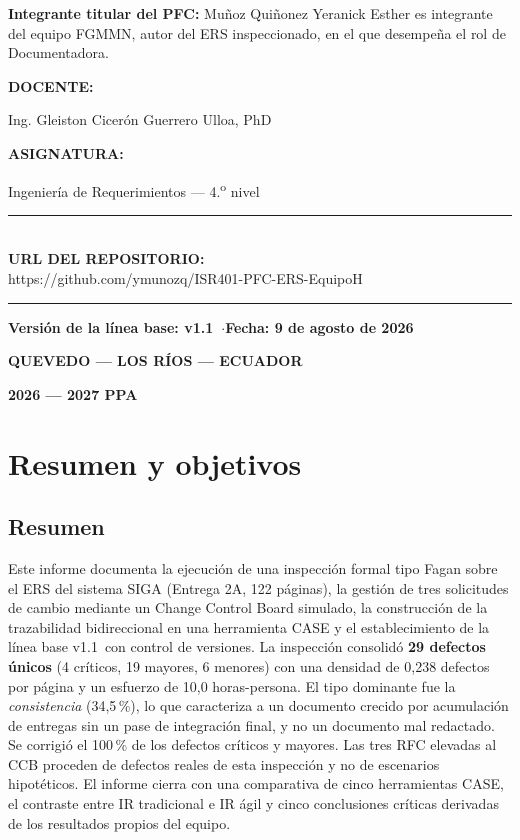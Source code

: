 \documentclass[11pt,letterpaper]{article}
\newcommand{\repourl}{https://github.com/ymunozq/ISR401-PFC-ERS-EquipoH}
\newcommand{\versionbase}{v1.1}
\begin{document}
\begin{titlepage}
{\small \textbf{Integrante titular del PFC:} Muñoz Quiñonez Yeranick Esther es integrante del equipo FGMMN, autor del ERS inspeccionado, en el que desempeña el rol de Documentadora.\par}
\vspace{8mm}

{\bfseries DOCENTE:\par} Ing. Gleiston Cicerón Guerrero Ulloa, PhD
\vspace{4mm}

{\bfseries ASIGNATURA:\par} Ingeniería de Requerimientos --- 4.\textsuperscript{o} nivel
\vspace{10mm}

{\color{uteqverde}\rule{\textwidth}{0.8pt}}\\[2mm]
{\bfseries URL DEL REPOSITORIO:}\\[1mm]
{\ttfamily \repourl}\\[2mm]
{\color{uteqverde}\rule{\textwidth}{0.8pt}}
\vspace{8mm}

{\bfseries Versión de la línea base: \versionbase\ \quad$\cdot$\quad Fecha: 9 de agosto de 2026\par}
\vspace{4mm}
{\bfseries QUEVEDO --- LOS RÍOS --- ECUADOR\par}
{\bfseries 2026 --- 2027 PPA\par}
\end{titlepage}

\newpage
\tableofcontents
\newpage

\section{Resumen y objetivos}

\subsection*{Resumen}
Este informe documenta la ejecución de una inspección formal tipo Fagan sobre el ERS del sistema SIGA (Entrega 2A, 122 páginas), la gestión de tres solicitudes de cambio mediante un Change Control Board simulado, la construcción de la trazabilidad bidireccional en una herramienta CASE y el establecimiento de la línea base \versionbase\ con control de versiones. La inspección consolidó \textbf{29 defectos únicos} (4 críticos, 19 mayores, 6 menores) con una densidad de 0,238 defectos por página y un esfuerzo de 10,0 horas-persona. El tipo dominante fue la \emph{consistencia} (34,5\,\%), lo que caracteriza a un documento crecido por acumulación de entregas sin un pase de integración final, y no un documento mal redactado. Se corrigió el 100\,\% de los defectos críticos y mayores. Las tres RFC elevadas al CCB proceden de defectos reales de esta inspección y no de escenarios hipotéticos. El informe cierra con una comparativa de cinco herramientas CASE, el contraste entre IR tradicional e IR ágil y cinco conclusiones críticas derivadas de los resultados propios del equipo.
\end{document}
